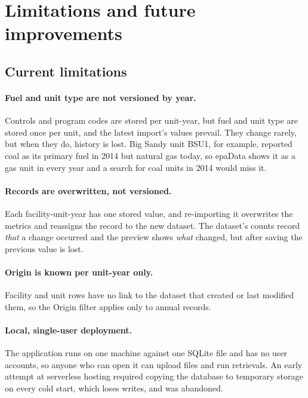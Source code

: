 \documentclass[11pt,a4paper]{article}
\begin{document}
\section{Limitations and future improvements}
\label{sec:limitations}

\subsection{Current limitations}

\paragraph{Fuel and unit type are not versioned by year.} Controls and program codes are stored
per unit-year, but fuel and unit type are stored once per unit, and the latest import's values
prevail. They change rarely, but when they do, history is lost. Big Sandy unit BSU1, for
example, reported coal as its primary fuel in 2014 but natural gas today, so epaData shows it as
a gas unit in every year and a search for coal units in 2014 would miss it.

\paragraph{Records are overwritten, not versioned.} Each facility-unit-year has one stored
value, and re-importing it overwrites the metrics and reassigns the record to the new dataset.
The dataset's counts record \emph{that} a change occurred and the preview shows \emph{what}
changed, but after saving the previous value is lost.

\paragraph{Origin is known per unit-year only.} Facility and unit rows have no link to the
dataset that created or last modified them, so the Origin filter applies only to annual
records.

\paragraph{Local, single-user deployment.} The application runs on one machine against one
SQLite file and has no user accounts, so anyone who can open it can upload files and run
retrievals. An early attempt at serverless hosting required copying the database to temporary
storage on every cold start, which loses writes, and was abandoned.
\end{document}
